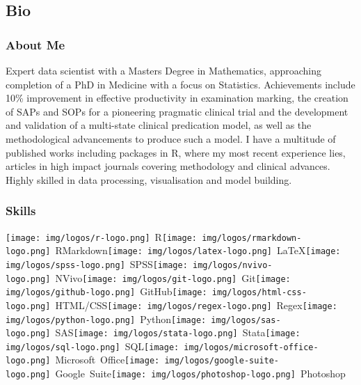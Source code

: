 \documentclass[
]{article}
\begin{document}
\begin{multicols}{2}
{\subsection{Bio}\label{bio}}

\hypertarget{about-me}{%
\subsubsection{About Me}\label{about-me}}

Expert data scientist with a Masters Degree in Mathematics, approaching
completion of a PhD in Medicine with a focus on Statistics. Achievements
include 10\% improvement in effective productivity in examination
marking, the creation of SAPs and SOPs for a pioneering pragmatic
clinical trial and the development and validation of a multi-state
clinical predication model, as well as the methodological advancements
to produce such a model. I have a multitude of published works including
packages in R, where my most recent experience lies, articles in high
impact journals covering methodology and clinical advances. Highly
skilled in data processing, visualisation and model building.

\hypertarget{skills}{%
\subsubsection{Skills}\label{skills}}

\mbox{\texttt{[image:  img/logos/r-logo.png]} R}\quad\mbox{\texttt{[image:  img/logos/rmarkdown-logo.png]} RMarkdown}\quad\mbox{\texttt{[image:  img/logos/latex-logo.png]} LaTeX}\quad\mbox{\texttt{[image:  img/logos/spss-logo.png]} SPSS}\quad\mbox{\texttt{[image:  img/logos/nvivo-logo.png]} NVivo}\quad\mbox{\texttt{[image:  img/logos/git-logo.png]} Git}\quad\mbox{\texttt{[image:  img/logos/github-logo.png]} GitHub}\quad\mbox{\texttt{[image:  img/logos/html-css-logo.png]} HTML/CSS}\quad\mbox{\texttt{[image:  img/logos/regex-logo.png]} Regex}\quad\mbox{\texttt{[image:  img/logos/python-logo.png]} Python}\quad\mbox{\texttt{[image:  img/logos/sas-logo.png]} SAS}\quad\mbox{\texttt{[image:  img/logos/stata-logo.png]} Stata}\quad\mbox{\texttt{[image:  img/logos/sql-logo.png]} SQL}\quad\mbox{\texttt{[image:  img/logos/microsoft-office-logo.png]} Microsoft Office}\quad\mbox{\texttt{[image:  img/logos/google-suite-logo.png]} Google Suite}\quad\mbox{\texttt{[image:  img/logos/photoshop-logo.png]} Photoshop}

\hypertarget{section-1}{%
\subsubsection{}\label{section-1}}

\end{multicols}
\end{document}
